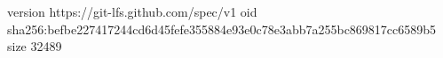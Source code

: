 version https://git-lfs.github.com/spec/v1
oid sha256:befbe227417244cd6d45fefe355884e93e0c78e3abb7a255bc869817cc6589b5
size 32489
